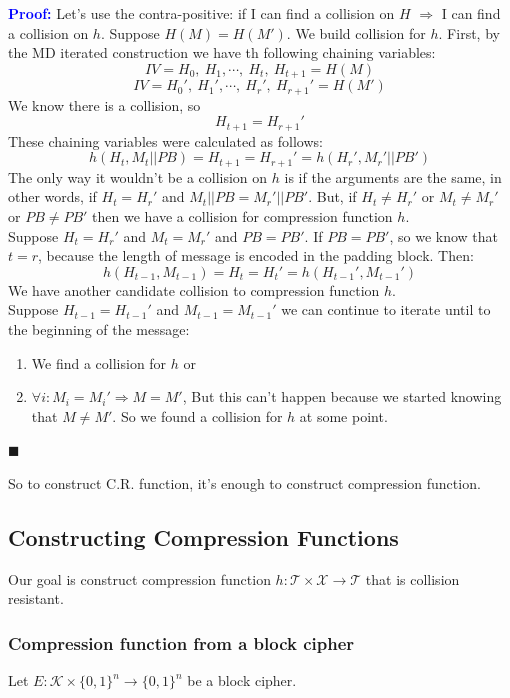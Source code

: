 \documentclass[12pt]{book}
\newcommand{\Proof}{\textcolor{blue}{\textbf{Proof:}} }
\begin{document}
\Proof Let's use the contra-positive: if I can find a collision on $H$ $\Rightarrow$ I can find a collision on $h$. Suppose $H(M)=H(M')$. We build collision for $h$. First, by the MD iterated construction we have th following chaining variables:
$$IV=H_{0},\ H_{1},\cdots,\ H_{t},\ H_{t+1}=H(M)$$
$$IV=H_{0}',\ H_{1}',\cdots,\ H_{r}',\ H_{r+1}'=H(M')$$We know there is a collision, so $$H_{t+1}=H_{r+1}'$$These chaining variables were calculated as follows:
$$h(H_{t},M_{t}||PB)=H_{t+1}=H_{r+1}'=h(H_{r}',M_{r}'||PB')$$The only way it wouldn't be a collision on $h$ is if the arguments are the same, in other words, if $H_{t}=H_{r}'$ and $M_{t}||PB=M_{r}'||PB'$. But, if $H_{t}\neq H_{r}'$ or $M_{t}\neq M_{r}'$ or $PB\neq PB'$ then we have a collision for compression function $h$.\\
Suppose $H_{t}=H_{r}'$ and $M_{t}=M_{r}'$ and $PB=PB'$. If $PB=PB'$, so we know that $t=r$, because the length of message is encoded in the padding block. Then:
$$h(H_{t-1},M_{t-1})=H_{t}=H_{t}'=h(H_{t-1}',M_{t-1}')$$We have another candidate collision to compression function $h$.\\
Suppose $H_{t-1}=H_{t-1}'$ and $M_{t-1}=M_{t-1}'$ we can continue to iterate until to the beginning of the message:
\begin{enumerate}
	\item We find a collision for $h$ or
	\item $\forall i: M_{i}=M_{i}'\Rightarrow M=M'$, But this can't happen because we started knowing that $M\neq M'$. So we found a collision for $h$ at some point.
\end{enumerate}

\hfill $\blacksquare$

So to construct C.R. function, it's enough to construct compression function.

\subsection{Constructing Compression Functions}
Our goal is construct compression function $h:\mathcal{T}\times\mathcal{X}\rightarrow\mathcal{T}$ that is collision resistant.

\subsubsection{Compression function from a block cipher}
Let $E:\mathcal{K}\times\{0,1\}^{n}\rightarrow\{0,1\}^{n}$ be a block cipher.
\end{document}
